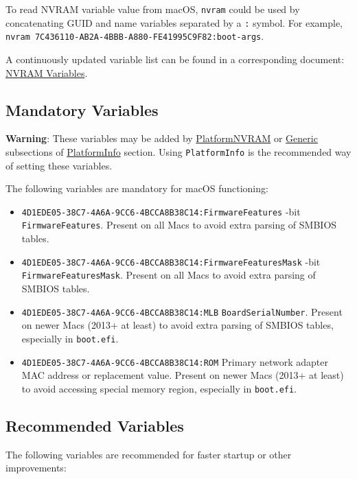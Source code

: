 \documentclass[]{article}
\makeatletter
\providecommand{\tightlist}{%
  \setlength{\itemsep}{0pt}\setlength{\parskip}{0pt}}
\renewcommand{\label}[1]{%
\zref@wrapper@immediate{\oldlabel{#1}}}  %
\makeatother
\begin{document}
To read NVRAM variable value from macOS, \texttt{nvram} could be used
by concatenating GUID and name variables separated by a \texttt{:} symbol.
For example, \texttt{nvram 7C436110-AB2A-4BBB-A880-FE41995C9F82:boot-args}.

A continuously updated variable list can be found in a corresponding document:
\href{https://docs.google.com/spreadsheets/d/1HTCBwfOBkXsHiK7os3b2CUc6k68axdJYdGl-TyXqLu0}{NVRAM Variables}.

\subsection{Mandatory Variables}\label{nvramvars}

\textbf{Warning}: These variables may be added by
\hyperref[platforminfonvram]{PlatformNVRAM} or
\hyperref[platforminfogeneric]{Generic} subsections of
\hyperref[platforminfo]{PlatformInfo} section.
Using \texttt{PlatformInfo} is the recommended way of setting these variables.

The following variables are mandatory for macOS functioning:

\begin{itemize}
\tightlist
\item
  \texttt{4D1EDE05-38C7-4A6A-9CC6-4BCCA8B38C14:FirmwareFeatures}
  -bit \texttt{FirmwareFeatures}. Present on all Macs to avoid extra parsing of SMBIOS tables.
\item
  \texttt{4D1EDE05-38C7-4A6A-9CC6-4BCCA8B38C14:FirmwareFeaturesMask}
  -bit \texttt{FirmwareFeaturesMask}. Present on all Macs to avoid extra parsing
  of SMBIOS tables.
\item
  \texttt{4D1EDE05-38C7-4A6A-9CC6-4BCCA8B38C14:MLB}
  \break
  \texttt{BoardSerialNumber}. Present on newer Macs (2013+ at least) to avoid extra parsing
  of SMBIOS tables, especially in \texttt{boot.efi}.
\item
  \texttt{4D1EDE05-38C7-4A6A-9CC6-4BCCA8B38C14:ROM}
  \break
  Primary network adapter MAC address or replacement value. Present on newer Macs
  (2013+ at least) to avoid accessing special memory region, especially in \texttt{boot.efi}.
\end{itemize}

\subsection{Recommended Variables}\label{nvramvarsrec}

The following variables are recommended for faster startup or other
improvements:
\end{document}
